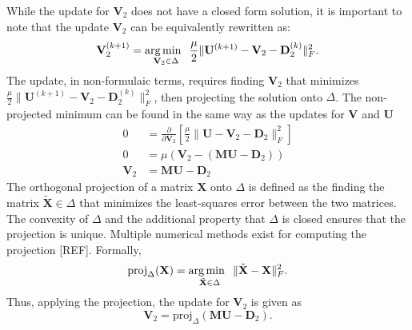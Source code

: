 While the update for $\mathbf{V}_2$ does not have a closed form solution, it is important to note that the update $\mathbf{V}_2$ can be equivalently rewritten as:
$$
\mathbf{V}_2^{(k+1)} = \operatorname*{arg\,min \;\;}_{\mathbf{V}_2 \in \Delta} \frac{\mu}{2} \|\mathbf{U}^{(k+1)} - \mathbf{V}_2 - \mathbf{D}_2^{(k)}\|_F^2.
$$
The update, in non-formulaic terms, requires finding $\mathbf{V}_2$ that minimizes $\frac{\mu}{2} \|\mathbf{U}^{(k+1)} - \mathbf{V}_2 - \mathbf{D}_2^{(k)}\|_F^2$, then projecting the solution onto $\Delta$. 
The non-projected minimum can be found in the same way as the updates for $\mathbf{V}$ and $\mathbf{U}$
\begin{equation*}
  \begin{aligned}
    0 &= \frac{\partial}{\partial \mathbf{V}_2} \left[\frac{\mu}{2} \|\mathbf{U} - \mathbf{V}_2 - \mathbf{D}_2\|_F^2\right]
    \\
    0 &= \mu(\mathbf{V}_2 - (\mathbf{MU} - \mathbf{D}_2))
    \\
    \mathbf{V}_2 &= \mathbf{MU} - \mathbf{D}_2
  \end{aligned}
\end{equation*}
The orthogonal projection of a matrix $\mathbf{X}$ onto $\Delta$ is defined as the finding the matrix $\tilde{\mathbf{X}} \in \Delta$ that minimizes the least-squares error between the two matrices. The convexity of $\Delta$ and the additional property that $\Delta$ is closed ensures that the projection is unique. Multiple numerical methods exist for computing the projection [REF]. Formally,
\begin{equation*}
  \text{proj}_\Delta(\mathbf{X}) = \operatorname*{arg\,min \;\;}_{\tilde{\mathbf{X}} \in \Delta} \|\tilde{\mathbf{X}} - \mathbf{X}\|_F^2.
\end{equation*}
Thus, applying the projection, the update for $\mathbf{V}_2$ is given as
\begin{equation*}
  \mathbf{V}_2 = \text{proj}_\Delta(\mathbf{MU} - \mathbf{D}_2).
\end{equation*}

